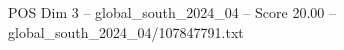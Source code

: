 \begin{textsample}{POS Dim 3 – global\_south\_2024\_04 – Score 20.00 – global\_south\_2024\_04/107847791.txt}
\end{textsample}
